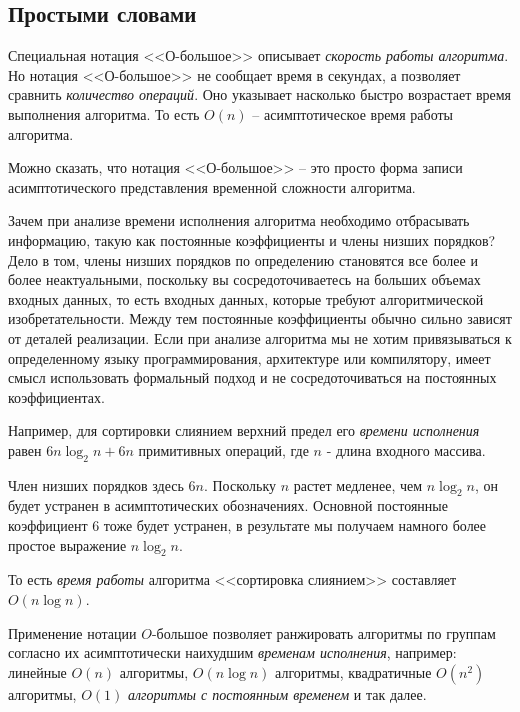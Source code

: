 \documentclass[%
	11pt,
	a4paper,
	utf8,
		]{article}
\begin{document}
\subsection{Простыми словами}

Специальная нотация <<О-большое>> описывает \emph{скорость работы алгоритма}. Но нотация <<О-большое>> не сообщает время в секундах, а позволяет сравнить \emph{количество операций}. Оно указывает насколько быстро возрастает время выполнения алгоритма. То есть $ O(n) $ -- асимптотическое время работы алгоритма.

Можно сказать, что нотация <<О-большое>> -- это просто форма записи асимптотического представления временной сложности алгоритма.


Зачем при анализе времени исполнения алгоритма необходимо отбрасывать информацию, такую как постоянные коэффициенты и члены низших порядков? Дело в том, члены низших порядков по определению становятся все более и более неактуальными, поскольку вы сосредоточиваетесь на больших объемах входных данных, то есть входных данных, которые требуют алгоритмической изобретательности. Между тем постоянные коэффициенты обычно сильно зависят от деталей реализации. Если при анализе алгоритма мы не хотим привязываться к определенному языку программирования, архитектуре или компилятору, имеет смысл использовать формальный подход и не сосредоточиваться на постоянных коэффициентах.

Например, для сортировки слиянием верхний предел его \emph{времени исполнения} равен $ 6 n \log_2 n + 6 n $ примитивных операций, где $ n $ - длина входного массива.

Член низших порядков здесь $ 6 n $. Поскольку $ n $ растет медленее, чем $ n \log_2 n $, он будет устранен в асимптотических обозначениях. Основной постоянные коэффициент 6 тоже будет устранен, в результате мы получаем намного более простое выражение $ n \log_2 n $. 

То есть \emph{время работы} алгоритма <<сортировка слиянием>> составляет $ O(n \log n) $.

Применение нотации $ O $-большое позволяет ранжировать алгоритмы по группам согласно их асимптотически наихудшим \emph{временам исполнения}, например: линейные $ O(n) $ алгоритмы, $ O(n \log n) $ алгоритмы, квадратичные $ O(n^2) $ алгоритмы, $ O(1) $ \emph{алгоритмы с постоянным временем} и так далее.
\end{document}
